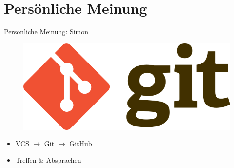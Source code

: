 \documentclass[aspectratio=169]{beamer}
\begin{document}
\section{Persönliche Meinung}
\begin{frame}[plain]{Persönliche Meinung: Simon}
    \begin{varwidth}{.4\textwidth}
        \begin{figure}
            \centering
            \includegraphics[width=.95\textwidth]{media/git-logo.png}
        \end{figure}
    \end{varwidth}
    \hfill
    \begin{varwidth}{.5\textwidth}
        \begin{itemize}\pause
            \item VCS $\rightarrow$ Git $\rightarrow$ GitHub\pause
            \item Treffen \& Absprachen 
        \end{itemize}
    \end{varwidth}
\end{frame}
\end{document}
